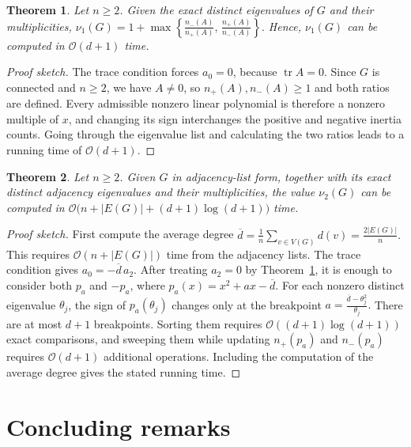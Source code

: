 \documentclass[10pt]{article}
\newtheorem{theorem}{Theorem}[section]
\begin{document}
\begin{theorem}
\label{thm:second-k1}
Let \(n\geq2\). Given the exact distinct eigenvalues of \(G\)
and their multiplicities,
\(
\nu_1(G)=
1+
\max\left\{
\frac{n_-(A)}{n_+(A)},\,
\frac{n_+(A)}{n_-(A)}
\right\}.
\)
Hence,
\(\nu_1(G)\) can be computed in \(\mathcal O(d+1)\) time.
\end{theorem}

\begin{proof}[Proof sketch]
The trace condition forces \(a_0=0\), because
\(\operatorname{tr}A=0\). Since \(G\) is connected and \(n\geq2\),
we have \(A\neq0\), so \(n_+(A),n_-(A)\geq1\) and both ratios are
defined. Every admissible nonzero linear polynomial is
therefore a nonzero multiple of \(x\), and changing its sign interchanges
the positive and negative inertia counts. Going through the eigenvalue list and calculating the two ratios leads to a running time of \(\mathcal O(d+1)\).
\end{proof}

\begin{theorem}
\label{thm:second-k2}
Let \(n\geq2\). Given \(G\) in adjacency-list form, together with its
exact distinct adjacency eigenvalues and their multiplicities, the value
\(\nu_2(G)\) can be computed in
\(
\mathcal O\bigl(
n+|E(G)|+(d+1)\log(d+1)
\bigr)
\) time.
\end{theorem}

\begin{proof}[Proof sketch]
First compute the average degree
\(
\overline d
=
\frac{1}{n}\sum_{v\in V(G)}d(v)
=
\frac{2|E(G)|}{n}.
\)
This requires \(\mathcal O(n+|E(G)|)\) time from the
adjacency lists. The trace condition gives
\(a_0=-\overline d\,a_2\). After treating \(a_2=0\) by
Theorem~\ref{thm:second-k1}, it is enough to consider both \(p_a\) and
\(-p_a\), where
\(
p_a(x)=x^2+ax-\overline d.
\)
For each nonzero distinct eigenvalue \(\theta_j\), the sign of
\(p_a(\theta_j)\) changes only at the breakpoint
\(
a=\frac{\overline d-\theta_j^2}{\theta_j}.
\)
There are at most \(d+1\) breakpoints. Sorting them
requires \(\mathcal O((d+1)\log(d+1))\) exact comparisons, and sweeping
them while updating \(n_+(p_a)\) and \(n_-(p_a)\) requires
\(\mathcal O(d+1)\) additional operations. Including the computation of
the average degree gives the stated running time.
\end{proof}





\section{Concluding remarks}\label{sec:concludingremarks}
\end{document}
